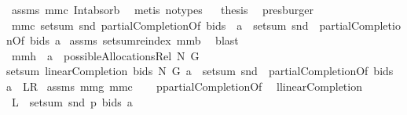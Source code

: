 \begin{isabellebody}
\ assms\ mm{}{}c\ Int{\isacharunderscore}absorb{}\ \isamarkupfalse%
\ {\isacharparenleft}metis\ {\isacharparenleft}no{\isacharunderscore}types{\isacharparenright}{\isacharparenright}\isanewline
{}\isamarkupfalse%
\ \isamarkupfalse%
\ {\isacharquery}thesis\ \isamarkupfalse%
\ presburger\isanewline
{}\isamarkupfalse%
%
\endisatagproof
{\isafoldproof}%
%
\isadelimproof
\isanewline
%
\endisadelimproof
{}\isamarkupfalse%
\ mm{}{}c{\isacharcolon}\ {\isachardoublequoteopen}setsum\ snd\ {\isacharparenleft}{\isacharparenleft}partialCompletionOf\ bids{\isacharparenright}\ {\isacharbackquote}\ a{\isacharparenright}\ {\isacharequal}\ setsum\ {\isacharparenleft}snd\ {\isasymcirc}\ {\isacharparenleft}partialCompletionOf\ bids{\isacharparenright}{\isacharparenright}\ a{\isachardoublequoteclose}\isanewline
%
\isadelimproof
%
\endisadelimproof
%
\isatagproof
{}\isamarkupfalse%
\ assms\ setsum{\isachardot}reindex\ mm{}{}b\ \isamarkupfalse%
\ blast%
\endisatagproof
{\isafoldproof}%
%
\isadelimproof
\isanewline
%
\endisadelimproof
{}\isamarkupfalse%
\ mm{}{}h{\isacharcolon}\ \ {\isachardoublequoteopen}a\ {\isasymin}\ possibleAllocationsRel\ N\ G{\isachardoublequoteclose}\ \ \isanewline
{\isachardoublequoteopen}setsum\ {\isacharparenleft}linearCompletion{\isacharprime}\ bids\ N\ G{\isacharparenright}\ a\ {\isacharequal}\ setsum\ {\isacharparenleft}snd\ {\isasymcirc}\ {\isacharparenleft}partialCompletionOf\ bids{\isacharparenright}{\isacharparenright}\ a{\isachardoublequoteclose}\ {\isacharparenleft}\ {\isachardoublequoteopen}{\isacharquery}L{\isacharequal}{\isacharquery}R{\isachardoublequoteclose}{\isacharparenright}\isanewline
%
\isadelimproof
%
\endisadelimproof
%
\isatagproof
{}\isamarkupfalse%
\ assms\ mm{}{}g\ mm{}{}c\ \isanewline
{}\isamarkupfalse%
\ {\isacharminus}\isanewline
{}\isamarkupfalse%
\ {\isacharquery}p{\isacharequal}partialCompletionOf\ \isamarkupfalse%
\ {\isacharquery}l{\isacharequal}linearCompletion{\isacharprime}\isanewline
{}\isamarkupfalse%
\ {\isachardoublequoteopen}{\isacharquery}L\ {\isacharequal}\ setsum\ snd\ {\isacharparenleft}{\isacharparenleft}{\isacharquery}p\ bids{\isacharparenright}{\isacharbackquote}\ a{\isacharparenright}{\isachardoublequoteclose}\ \isamarkupfalse%

\end{isabellebody}
